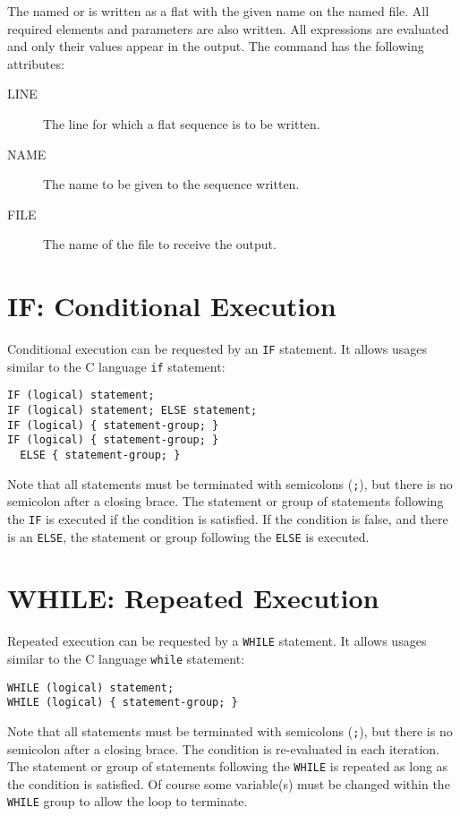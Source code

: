 The named  or  is
written as a flat  with the given
name on the named file. 
All required elements and parameters are also written.
All expressions are evaluated and only their values appear in the
output. 
The command has the following attributes:
\begin{description}
\item[LINE]
  The line for which a flat sequence is to be written.
\item[NAME]
  The name to be given to the sequence written.
\item[FILE]
  The name of the file to receive the output.
\end{description}

\section{IF: Conditional Execution}
\label{sec:if}
Conditional execution can be requested by an \texttt{IF} statement.
It allows usages similar to the C language \texttt{if} statement:
\begin{verbatim}
IF (logical) statement;
IF (logical) statement; ELSE statement;
IF (logical) { statement-group; }
IF (logical) { statement-group; } 
  ELSE { statement-group; }
\end{verbatim}
Note that all statements must be terminated with semicolons (\texttt{;}),
but there is no semicolon after a closing brace.
The statement or group of statements following the \texttt{IF} is
executed if the condition is satisfied.
If the condition is false, and there is an \texttt{ELSE},
the statement or group following the \texttt{ELSE} is executed.

\section{WHILE: Repeated Execution}
\label{sec:while}
Repeated execution can be requested by a \texttt{WHILE} statement.
It allows usages similar to the C language \texttt{while} statement:
\begin{verbatim}
WHILE (logical) statement;
WHILE (logical) { statement-group; }
\end{verbatim}
Note that all statements must be terminated with semicolons (\texttt{;}),
but there is no semicolon after a closing brace.
The condition is re-evaluated in each iteration.
The statement or group of statements following the \texttt{WHILE} is
repeated as long as the condition is satisfied.
Of course some variable(s) must be changed within the \texttt{WHILE} group 
to allow the loop to terminate.

